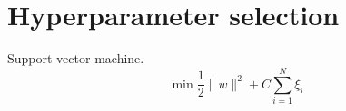 \section{Hyperparameter selection}
Support vector machine.
\[
\min \frac{1}{2} \|w\|^2 + C \sum_{i=1}^N \xi_i
\]